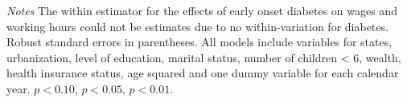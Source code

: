 \documentclass[10pt,letterpaper]{article}
\begin{document}
\begin{table}[p]
\begin{center}
\begin{adjustbox}{max width=\linewidth}
\begin{threeparttable}
{\begin{tablenotes}
	\item \footnotesize \textit{Notes} The within estimator for the effects of early onset diabetes on wages and working hours could not be estimates due to no within-variation for diabetes. Robust standard errors in parentheses. All models include variables for  states, urbanization, level of education, marital status, number of children < 6, wealth, health insurance status, age squared and one dummy variable for each calendar year. \sym{*} \(p<0.10\), \sym{**} \(p<0.05\), \sym{***} \(p<0.01\).
\end{tablenotes}
}
\end{threeparttable}
\end{adjustbox}
\end{center}
\end{table}
\end{document}
